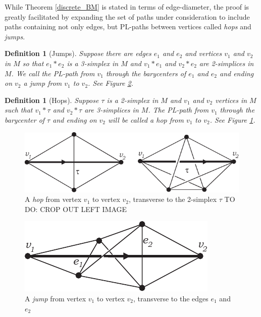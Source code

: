 \documentclass[12pt]{article}
\newtheorem{dfn}[thm]{Definition}
\begin{document}
While Theorem \ref{discrete_BM} is stated in terms of edge-diameter, the proof is greatly facilitated by expanding the set of paths under consideration to include paths containing not only edges, but PL-paths between vertices called {\em hops} and {\em jumps}.

\begin{dfn}[Jumps] Suppose there are edges $e_1$ and $e_2$ and vertices $v_1$ and $v_2$ in $M$ so that $e_1*e_2$ is a 3-simplex in $M$ and $v_1*e_1$ and $v_2*e_2$ are 2-simplices in $M$. We call the PL-path from $v_1$ through the barycenters of $e_1$ and $e_2$ and ending on $v_2$ a {\em jump} from $v_1$ to $v_2$. See Figure \ref{jump_fig}.
\end{dfn}

\begin{dfn}[Hops] Suppose $\tau$ is a 2-simplex in $M$ and $v_1$ and $v_2$ vertices in $M$ such that $v_1*\tau$ and $v_2*\tau$ are 3-simplices in $M$. The PL-path from $v_1$ through the barycenter of $\tau$ and ending on $v_2$ will be called a {\em hop} from $v_1$ to $v_2$. See Figure \ref{hop_fig}.
\end{dfn}



\begin{figure}
    \begin{center}
        \includegraphics[width=0.6\linewidth]{figures/hops.pdf}
        \caption{A {\em hop} from vertex $v_1$ to vertex $v_2$, transverse to the 2-simplex $\tau$ TO DO: CROP OUT LEFT IMAGE}
    \end{center}
    \label{hop_fig}
\end{figure}


\begin{figure}
    \begin{center}
        \includegraphics[width=0.4\linewidth]{figures/jump.pdf}
        \caption{A {\em jump} from vertex $v_1$ to vertex $v_2$, transverse to the edges $e_1$ and $e_2$}
    \end{center}
    \label{jump_fig}
\end{figure}
\end{document}
